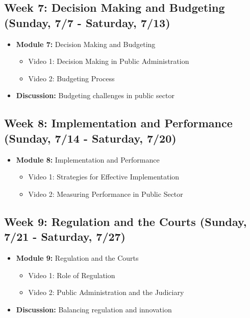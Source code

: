 \documentclass[11pt, letterpaper]{article}
\begin{document}
\subsection*{Week 7: Decision Making and Budgeting (Sunday, 7/7 - Saturday, 7/13)}
\begin{itemize}
    \item \textbf{Module 7:} Decision Making and Budgeting
    \begin{itemize}
        \item Video 1: Decision Making in Public Administration
        \item Video 2: Budgeting Process
    \end{itemize}
    \item \textbf{Discussion:} Budgeting challenges in public sector
\end{itemize}

\subsection*{Week 8: Implementation and Performance (Sunday, 7/14 - Saturday, 7/20)}
\begin{itemize}
    \item \textbf{Module 8:} Implementation and Performance
    \begin{itemize}
        \item Video 1: Strategies for Effective Implementation
        \item Video 2: Measuring Performance in Public Sector
    \end{itemize}
\end{itemize}

\subsection*{Week 9: Regulation and the Courts (Sunday, 7/21 - Saturday, 7/27)}
\begin{itemize}
    \item \textbf{Module 9:} Regulation and the Courts
    \begin{itemize}
        \item Video 1: Role of Regulation
        \item Video 2: Public Administration and the Judiciary
    \end{itemize}
    \item \textbf{Discussion:} Balancing regulation and innovation
\end{itemize}
\end{document}
